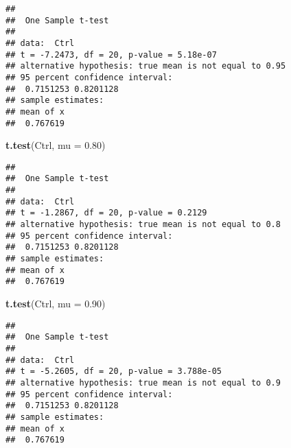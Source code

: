 \documentclass[
]{article}
\newenvironment{Shaded}{\begin{snugshade}}{\end{snugshade}}
\newcommand{\AttributeTok}[1]{\textcolor[rgb]{0.13,0.29,0.53}{#1}}
\newcommand{\CommentTok}[1]{\textcolor[rgb]{0.56,0.35,0.01}{\textit{#1}}}
\newcommand{\FloatTok}[1]{\textcolor[rgb]{0.00,0.00,0.81}{#1}}
\newcommand{\FunctionTok}[1]{\textcolor[rgb]{0.13,0.29,0.53}{\textbf{#1}}}
\newcommand{\NormalTok}[1]{#1}
\newcommand{\OtherTok}[1]{\textcolor[rgb]{0.56,0.35,0.01}{#1}}
\newcommand{\SpecialCharTok}[1]{\textcolor[rgb]{0.81,0.36,0.00}{\textbf{#1}}}
\begin{document}
\begin{verbatim}
## 
##  One Sample t-test
## 
## data:  Ctrl
## t = -7.2473, df = 20, p-value = 5.18e-07
## alternative hypothesis: true mean is not equal to 0.95
## 95 percent confidence interval:
##  0.7151253 0.8201128
## sample estimates:
## mean of x 
##  0.767619
\end{verbatim}

\begin{Shaded}
\begin{Highlighting}[]
\FunctionTok{t.test}\NormalTok{(Ctrl, }\AttributeTok{mu =} \FloatTok{0.80}\NormalTok{)                           }
\end{Highlighting}
\end{Shaded}

\begin{verbatim}
## 
##  One Sample t-test
## 
## data:  Ctrl
## t = -1.2867, df = 20, p-value = 0.2129
## alternative hypothesis: true mean is not equal to 0.8
## 95 percent confidence interval:
##  0.7151253 0.8201128
## sample estimates:
## mean of x 
##  0.767619
\end{verbatim}

\begin{Shaded}
\begin{Highlighting}[]
\FunctionTok{t.test}\NormalTok{(Ctrl, }\AttributeTok{mu =} \FloatTok{0.90}\NormalTok{)        }
\end{Highlighting}
\end{Shaded}

\begin{verbatim}
## 
##  One Sample t-test
## 
## data:  Ctrl
## t = -5.2605, df = 20, p-value = 3.788e-05
## alternative hypothesis: true mean is not equal to 0.9
## 95 percent confidence interval:
##  0.7151253 0.8201128
## sample estimates:
## mean of x 
##  0.767619
\end{verbatim}

\begin{Shaded}
\end{Shaded}
\end{document}
